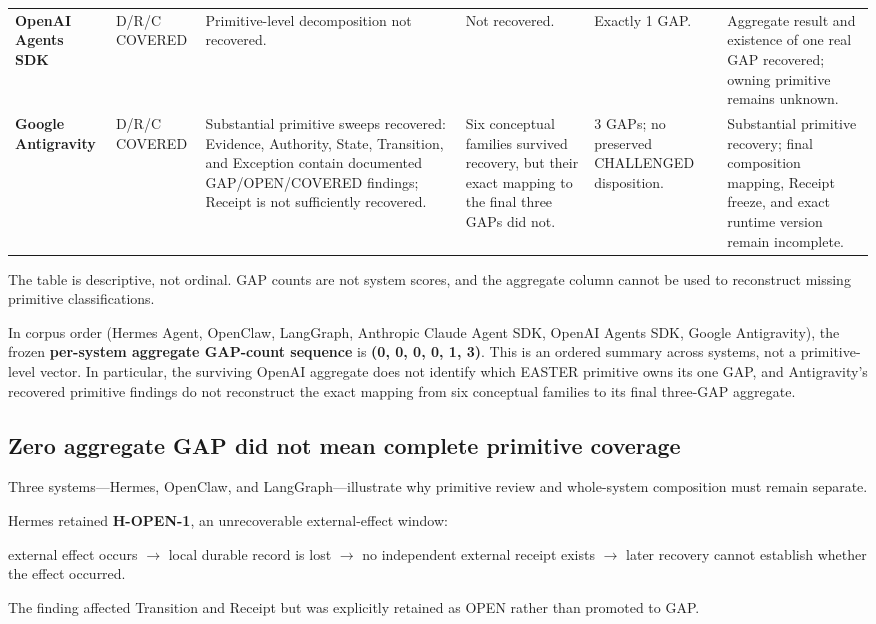 \documentclass[11pt]{article}
\begin{document}
\begin{table}[htbp]
\begin{tabularx}{\textwidth}{X X X X X X}
\textbf{OpenAI Agents SDK} & D/R/C COVERED & Primitive-level decomposition not recovered. & Not recovered. & Exactly 1 GAP. & Aggregate result and existence of one real GAP recovered; owning primitive remains unknown. \\
\textbf{Google Antigravity} & D/R/C COVERED & Substantial primitive sweeps recovered: Evidence, Authority, State, Transition, and Exception contain documented GAP/OPEN/COVERED findings; Receipt is not sufficiently recovered. & Six conceptual families survived recovery, but their exact mapping to the final three GAPs did not. & 3 GAPs; no preserved CHALLENGED disposition. & Substantial primitive recovery; final composition mapping, Receipt freeze, and exact runtime version remain incomplete. \\
\bottomrule
\end{tabularx}
\end{table}


The table is descriptive, not ordinal. GAP counts are not system scores, and the aggregate column cannot be used to reconstruct missing primitive classifications.

In corpus order (Hermes Agent, OpenClaw, LangGraph, Anthropic Claude Agent SDK, OpenAI Agents SDK, Google Antigravity), the frozen \textbf{per-system aggregate GAP-count sequence} is \textbf{(0, 0, 0, 0, 1, 3)}. This is an ordered summary across systems, not a primitive-level vector. In particular, the surviving OpenAI aggregate does not identify which EASTER primitive owns its one GAP, and Antigravity's recovered primitive findings do not reconstruct the exact mapping from six conceptual families to its final three-GAP aggregate.

\subsection{Zero aggregate GAP did not mean complete primitive coverage}

Three systems---Hermes, OpenClaw, and LangGraph---illustrate why primitive review and whole-system composition must remain separate.

Hermes retained \textbf{H-OPEN-1}, an unrecoverable external-effect window:

external effect occurs
$\rightarrow$ local durable record is lost
$\rightarrow$ no independent external receipt exists
$\rightarrow$ later recovery cannot establish whether the effect occurred.

The finding affected Transition and Receipt but was explicitly retained as OPEN rather than promoted to GAP.
\end{document}
